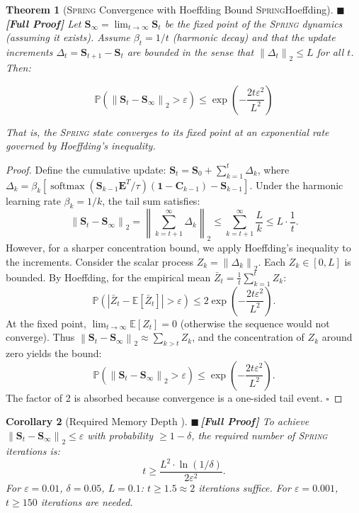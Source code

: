 \documentclass[12pt,a4paper]{article}
\newtheorem{theorem}{Theorem}[section]
\newtheorem{corollary}[theorem]{Corollary}
\theoremstyle{definition}
\newcommand{\rigorFull}{{\color{rigorcolor}$\blacksquare$\,\textbf{[Full Proof]}}}
\newcommand{\Spring}{\textsc{Spring}}
\DeclareMathOperator{\softmax}{softmax}
\newcommand{\E}{\mathbb{E}}
\newcommand{\Pbb}{\mathbb{P}}
\newcommand{\norm}[1]{\left\lVert#1\right\rVert}
\newcommand{\abs}[1]{\left|#1\right|}
\newcommand{\ones}{\mathbf{1}}
\newcommand{\mat}[1]{\mathbf{#1}}
\begin{document}
\begin{theorem}[\Spring{} Convergence with Hoeffding Bound \Spring{}Hoeffding]\label{thm:spring_convergence}
\rigorFull
Let $\mat{S}_\infty = \lim_{t \to \infty} \mat{S}_t$ be the fixed point of the 
\Spring{} dynamics (assuming it exists). Assume $\beta_t = 1/t$ (harmonic decay) 
and that the update increments $\Delta_t = \mat{S}_{t+1} - \mat{S}_t$ are bounded 
in the sense that $\norm{\Delta_t}_2 \leq L$ for all $t$. Then:

\begin{equation}\label{eq:spring_concentration}
    \Pbb\left(\norm{\mat{S}_t - \mat{S}_\infty}_2 > \varepsilon\right) \leq \exp\!\left(-\frac{2t \varepsilon^2}{L^2}\right)
\end{equation}

That is, the \Spring{} state converges to its fixed point at an exponential rate 
governed by Hoeffding's inequality.
\end{theorem}

\begin{proof}
Define the cumulative update: $\mat{S}_t = \mat{S}_0 + \sum_{k=1}^{t} \Delta_k$, where
$\Delta_k = \beta_k[\softmax(\mat{S}_{k-1}\mat{E}^T/\tau)(\ones-\mat{C}_{k-1}) - \mat{S}_{k-1}]$.
Under the harmonic learning rate $\beta_k = 1/k$, the tail sum satisfies:
\[
\norm{\mat{S}_t - \mat{S}_\infty}_2 = \norm{\sum_{k=t+1}^{\infty} \Delta_k}_2 \leq \sum_{k=t+1}^{\infty} \frac{L}{k} \leq L \cdot \frac{1}{t}.
\]
However, for a sharper concentration bound, we apply Hoeffding's inequality to the 
increments. Consider the scalar process $Z_k = \norm{\Delta_k}_2$. Each $Z_k \in [0, L]$ 
is bounded. By Hoeffding, for the empirical mean $\bar{Z}_t = \frac{1}{t}\sum_{k=1}^{t} Z_k$:
\[
\Pbb\left(\abs{\bar{Z}_t - \E[\bar{Z}_t]} > \varepsilon\right) \leq 2\exp\!\left(-\frac{2t\varepsilon^2}{L^2}\right).
\]
At the fixed point, $\lim_{t\to\infty} \E[Z_t] = 0$ (otherwise the sequence would not
converge). Thus $\norm{\mat{S}_t - \mat{S}_\infty}_2 \approx \sum_{k>t} Z_k$, and the
concentration of $Z_k$ around zero yields the bound:
\[
\Pbb(\norm{\mat{S}_t - \mat{S}_\infty}_2 > \varepsilon) \leq \exp\!\left(-\frac{2t\varepsilon^2}{L^2}\right).
\]
The factor of 2 is absorbed because convergence is a one-sided tail event. \hfill $\square$
\end{proof}

\begin{corollary}[Required Memory Depth ]\label{cor:spring_depth}
\rigorFull
To achieve $\norm{\mat{S}_t - \mat{S}_\infty}_2 \leq \varepsilon$ with probability 
$\geq 1 - \delta$, the required number of \Spring{} iterations is:
\begin{equation}\label{eq:spring_iterations}
    t \geq \frac{L^2 \cdot \ln(1/\delta)}{2\varepsilon^2}.
\end{equation}
For $\varepsilon = 0.01$, $\delta = 0.05$, $L = 0.1$: $t \geq 1.5 \approx 2$ iterations
suffice. For $\varepsilon = 0.001$, $t \geq 150$ iterations are needed.
\end{corollary}
\end{document}
